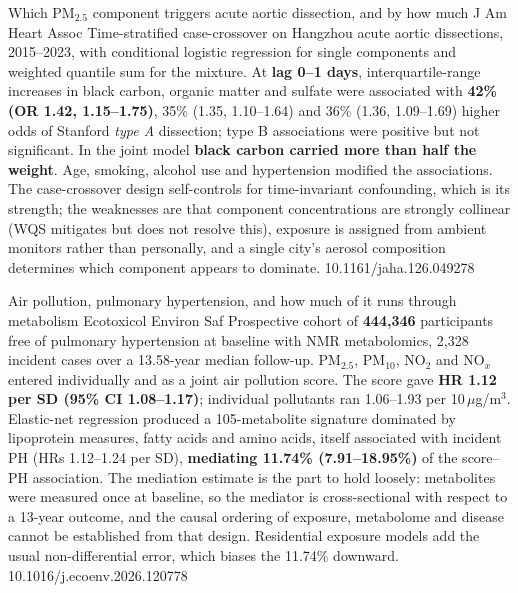 \documentclass[10pt]{article}
\begin{document}
{Which PM$_{2.5}$ component triggers acute aortic dissection, and by how much}
{J Am Heart Assoc}
{Time-stratified case-crossover on Hangzhou acute aortic dissections, 2015--2023, with
conditional logistic regression for single components and weighted quantile sum for the
mixture. At \textbf{lag 0--1 days}, interquartile-range increases in black carbon, organic
matter and sulfate were associated with \textbf{42\% (OR 1.42, 1.15--1.75)}, 35\% (1.35,
1.10--1.64) and 36\% (1.36, 1.09--1.69) higher odds of Stanford \emph{type A} dissection;
type B associations were positive but not significant. In the joint model
\textbf{black carbon carried more than half the weight}. Age, smoking, alcohol use and
hypertension modified the associations. The case-crossover design self-controls for
time-invariant confounding, which is its strength; the weaknesses are that component
concentrations are strongly collinear (WQS mitigates but does not resolve this), exposure
is assigned from ambient monitors rather than personally, and a single city's aerosol
composition determines which component appears to dominate.}
{10.1161/jaha.126.049278}

{Air pollution, pulmonary hypertension, and how much of it runs through metabolism}
{Ecotoxicol Environ Saf}
{Prospective cohort of \textbf{444{,}346} participants free of pulmonary hypertension at
baseline with NMR metabolomics, 2{,}328 incident cases over a 13.58-year median follow-up.
PM$_{2.5}$, PM$_{10}$, NO$_2$ and NO$_x$ entered individually and as a joint air pollution
score. The score gave \textbf{HR 1.12 per SD (95\% CI 1.08--1.17)}; individual pollutants
ran 1.06--1.93 per 10\,$\mu$g/m$^3$. Elastic-net regression produced a 105-metabolite
signature dominated by lipoprotein measures, fatty acids and amino acids, itself associated
with incident PH (HRs 1.12--1.24 per SD), \textbf{mediating 11.74\% (7.91--18.95\%)} of the
score--PH association. The mediation estimate is the part to hold loosely: metabolites were
measured once at baseline, so the mediator is cross-sectional with respect to a 13-year
outcome, and the causal ordering of exposure, metabolome and disease cannot be established
from that design. Residential exposure models add the usual non-differential error, which
biases the 11.74\% downward.}
{10.1016/j.ecoenv.2026.120778}

\end{document}
